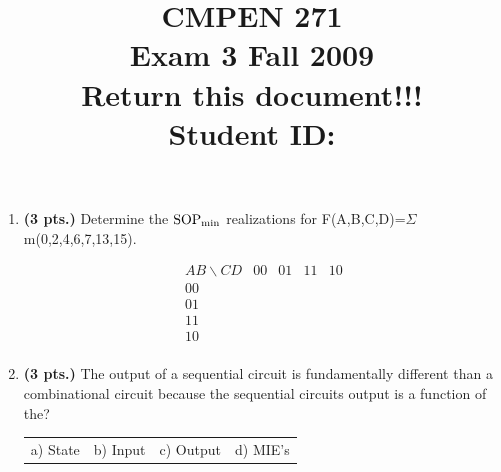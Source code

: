 \documentclass{article}
\begin{document}
\newcommand{\SOPmin}{${\rm SOP}_{\rm min} \ $}
\newcommand{\POSmin}{${\rm POS}_{\rm min} \ $}
\newcommand{\bs}{\backslash}
\newcommand{\x}{\addtocounter{enumi}{1} \theenumi}


\title{
\Huge{CMPEN 271}\\
\normalsize{Exam 3		Fall 2009}\\
\normalsize{Return this document!!!}\\
Student ID:}
\date{}

\maketitle{}

\begin{enumerate}
\item {\bf (3 pts.)} Determine the \SOPmin realizations for
F(A,B,C,D)=$\Sigma$m(0,2,4,6,7,13,15).

$$ \begin{array} {c||c|c|c|c}
        AB \bs CD & 00 & 01 & 11 & 10 \\ \hline \hline
        00        &    &    &    &    \\ \hline
        01        &    &    &    &    \\ \hline
        11        &    &    &    &    \\ \hline
        10        &    &    &    &    \\
\end{array} $$ 


\item {\bf (3 pts.)} The output of a sequential circuit is fundamentally
different than a combinational circuit because the sequential circuits 
output is a function of the?

\begin{tabular}{p{0.75in}p{0.75in}p{0.75in}p{0.75in}}
a) State & b) Input & c) Output & d) MIE's \\
\end{tabular}


\end{enumerate}
\end{document}
